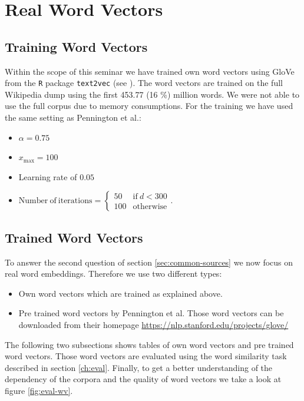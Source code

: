 \chapter{Real Word Vectors}\label{ch:real_wv}

\section{Training Word Vectors}

Within the scope of this seminar we have trained own word vectors using GloVe from  
the \texttt{R} package \texttt{text2vec} (see \cite{text2vec}). The word vectors 
are trained on the full Wikipedia dump using the first 453.77 (16 \%) million words. 
We were not able to use the full corpus due to memory consumptions. For the training
we have used the same setting as Pennington et al.:
\begin{itemize}
  \item $\alpha = 0.75$
  \item $x_\mathrm{max} = 100$
  \item Learning rate of $0.05$
  \item $\mathrm{Number\ of\ iterations} = \left\{\begin{array}{cc}
         50 & \text{if} \ d < 300 \\
         100 & \text{otherwise}
         \end{array}\right.$.
\end{itemize}

\section{Trained Word Vectors}

To answer the second question of section \ref{sec:common-sources} we now focus on
real word embeddings. Therefore we use two different types:
\begin{itemize}
  \item
    Own word vectors which are trained as explained above.
    
  \item
    Pre trained word vectors by Pennington et al. Those word vectors
    can be downloaded from their homepage \url{https://nlp.stanford.edu/projects/glove/}
\end{itemize}

The following two subsections shows tables of own word vectors and pre trained 
word vectors. Those word vectors are evaluated using the word similarity task
described in section \ref{ch:eval}. Finally, to get a better understanding of 
the dependency of the corpora and the quality of word vectors we take a look 
at figure \ref{fig:eval-wv}.

